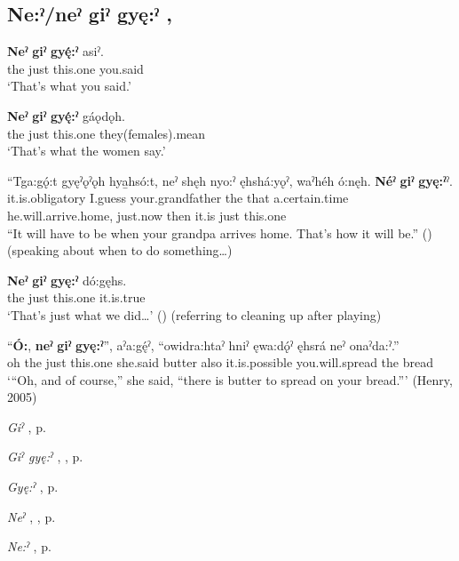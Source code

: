 \subsection*{\textbf{Ne:ˀ/neˀ giˀ gyę:ˀ} , } \label{p:[ne:ˀ/neˀ giˀ gyę:ˀ]}

\ea
\label{ex:npar53}
\gll \textbf{Neˀ} \textbf{giˀ} \textbf{gyę́:ˀ} asiˀ.\\
the just this.one you.said\\
\glt ‘That’s what you said.’
\z

\ea
\label{ex:npar54}
\gll \textbf{Neˀ} \textbf{giˀ} \textbf{gyę́:ˀ} gáǫdǫh.\\
the just this.one they(females).mean\\
\glt ‘That’s what the women say.’
\z


\ea
\label{ex:npar55}
\gll “Tga:gǫ́:t gyęˀǫˀǫh hya̱hsó:t, neˀ shęh nyo:ˀ ęhshá:yǫˀ, waˀhéh ó:nęh. \textbf{Néˀ} \textbf{giˀ} \textbf{gyę:ˀ}ˀ.\\
it.is.obligatory I.guess your.grandfather the that a.certain.time he.will.arrive.home, just.now then it.is just this.one\\
\glt “It will have to be when your grandpa arrives home. That’s how it will be.” (\cite{henry_de_2005}) (speaking about when to do something…) 
\z


\ea
\label{ex:npar56}
\gll \textbf{Neˀ} \textbf{giˀ} \textbf{gyę:ˀ} dó:gęhs.\\
the just this.one it.is.true\\
\glt ‘That’s just what we did…’ (\cite{henry_de_2005}) (referring to cleaning up after playing)
\z

\ea
\label{ex:npar57}
\gll “\textbf{Ó:}, \textbf{neˀ} \textbf{giˀ} \textbf{gyę:ˀ}”, aˀa:gę́ˀ, “owidra:htaˀ hniˀ ęwa:dǫ́ˀ ęhsrá neˀ onaˀda:ˀ.”\\
oh the just this.one she.said butter also it.is.possible you.will.spread the bread\\
\glt ‘“Oh, and of course,” she said, “there is butter to spread on your bread.”’ (Henry, 2005)
\z

\begin{CayugaRelated}
\item \textit{Giˀ} , p. \pageref{p:[giˀ]}\\
\item \textit{Giˀ gyę:ˀ} , , p. \pageref{p:[giˀ gyę:ˀ] ‘quite’}\\
\item \textit{Gyę:ˀ} , p. \pageref{p:[gyę:ˀ]}\\
\item \textit{Neˀ} , , p. \pageref{p:[neˀ]}\\
\item \textit{Ne:ˀ} , p. \pageref{p:[ne:ˀ] `it is’}
\end{CayugaRelated}

